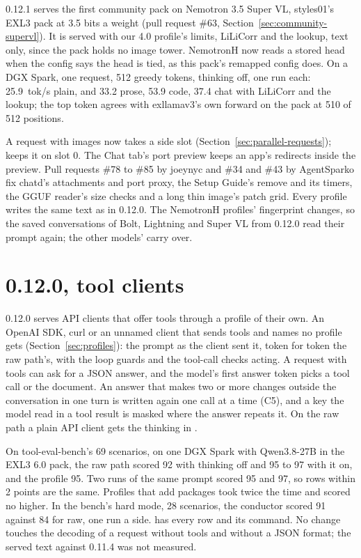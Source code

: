 0.12.1 serves the first community pack on Nemotron 3.5 Super VL, styles01's EXL3 pack at 3.5 bits a weight (pull request \#63, Section~\ref{sec:community-supervl}). It is served with our 4.0 profile's limits, LiLiCorr and the lookup, text only, since the pack holds no image tower. NemotronH now reads a stored head when the config says the head is tied, as this pack's remapped config does. On a DGX Spark, one request, 512 greedy tokens, thinking off, one run each: 25.9~tok/s plain, and 33.2 prose, 53.9 code, 37.4 chat with LiLiCorr and the lookup; the top token agrees with exllamav3's own forward on the pack at 510 of 512 positions.

A request with images now takes a side slot (Section~\ref{sec:parallel-requests});  keeps it on slot 0. The Chat tab's port preview keeps an app's redirects inside the preview. Pull requests \#78 to \#85 by joeynyc and \#34 and \#43 by AgentSparko fix chatd's attachments and port proxy, the Setup Guide's remove and its timers, the GGUF reader's size checks and a long thin image's patch grid. Every profile writes the same text as in 0.12.0. The NemotronH profiles' fingerprint changes, so the saved conversations of Bolt, Lightning and Super VL from 0.12.0 read their prompt again; the other models' carry over.

\section{0.12.0, tool clients}\label{sec:changelog-0120}

0.12.0 serves API clients that offer tools through a profile of their own. An OpenAI SDK, curl or an unnamed client that sends tools and names no profile gets  (Section~\ref{sec:profiles}): the prompt as the client sent it, token for token the raw path's, with the loop guards and the tool-call checks acting. A request with tools can ask for a JSON answer, and the model's first answer token picks a tool call or the document. An answer that makes two or more changes outside the conversation in one turn is written again one call at a time (C5), and a key the model read in a tool result is masked where the answer repeats it. On the raw path a plain API client gets the thinking in .

On tool-eval-bench's 69 scenarios, on one DGX Spark with Qwen3.8-27B in the EXL3 6.0 pack, the raw path scored 92 with thinking off and 95 to 97 with it on, and the  profile 95. Two runs of the same prompt scored 95 and 97, so rows within 2 points are the same. Profiles that add packages took twice the time and scored no higher. In the bench's hard mode, 28 scenarios, the conductor scored 91 against 84 for raw, one run a side.  has every row and its command. No change touches the decoding of a request without tools and without a JSON format; the served text against 0.11.4 was not measured.

